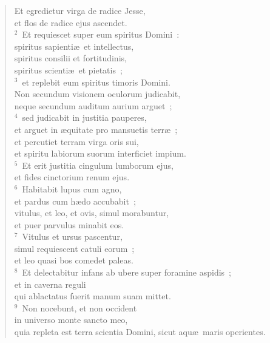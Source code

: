 \begin{flushleft}\begin{verse}\vspace{-19pt}\hspace{6pt}Et egredietur virga de radice Jesse,\\\hspace{6pt} et flos de radice ejus ascendet.\\
${}^{2}$~Et requiescet super eum spiritus Domini~:\\ spiritus sapienti\ae\ et intellectus,\\ spiritus consilii et fortitudinis,\\ spiritus scienti\ae\ et pietatis~;\\
${}^{3}$~et replebit eum spiritus timoris Domini.\\ Non secundum visionem oculorum judicabit,\\ neque secundum auditum aurium arguet~;\\
${}^{4}$~sed judicabit in justitia pauperes,\\ et arguet in \ae quitate pro mansuetis terr\ae~;\\ et percutiet terram virga oris sui,\\ et spiritu labiorum suorum interficiet impium.\\
${}^{5}$~Et erit justitia cingulum lumborum ejus,\\ et fides cinctorium renum ejus.\\
${}^{6}$~Habitabit lupus cum agno,\\ et pardus cum h\ae do accubabit~;\\ vitulus, et leo, et ovis, simul morabuntur,\\ et puer parvulus minabit eos.\\
${}^{7}$~Vitulus et ursus pascentur,\\ simul requiescent catuli eorum~;\\ et leo quasi bos comedet paleas.\\
${}^{8}$~Et delectabitur infans ab ubere super foramine aspidis~;\\ et in caverna reguli\\ qui ablactatus fuerit manum suam mittet.\\
${}^{9}$~Non nocebunt, et non occident\\ in universo monte sancto meo,\\ quia repleta est terra scientia Domini, sicut aqu\ae\ maris operientes.\end{verse}\end{flushleft}


